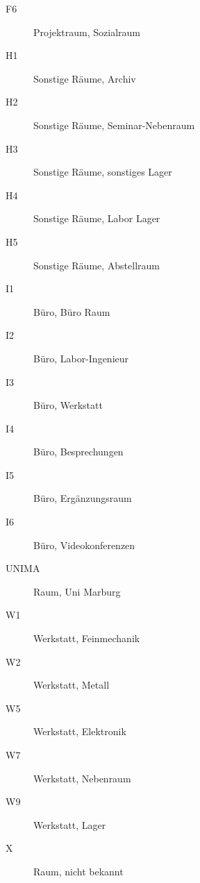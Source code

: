 \begin{description}
	\item[F6]	Projektraum, Sozialraum
	\item[H1]	Sonstige Räume, Archiv
	\item[H2]	Sonstige Räume, Seminar-Nebenraum
	\item[H3]	Sonstige Räume, sonstiges Lager
	\item[H4]	Sonstige Räume, Labor Lager
	\item[H5]	Sonstige Räume, Abstellraum
	\item[I1]	Büro, Büro	Raum
	\item[I2]	Büro, Labor-Ingenieur
	\item[I3]	Büro, Werkstatt
	\item[I4]	Büro, Besprechungen
	\item[I5]	Büro, Ergänzungsraum
	\item[I6]	Büro, Videokonferenzen
	\item[UNIMA]	Raum, Uni Marburg
	\item[W1]	Werkstatt, Feinmechanik
	\item[W2]	Werkstatt, Metall
	\item[W5]	Werkstatt, Elektronik
	\item[W7]	Werkstatt, Nebenraum
	\item[W9]	Werkstatt, Lager
	\item[X]	Raum, nicht bekannt
\end{description}